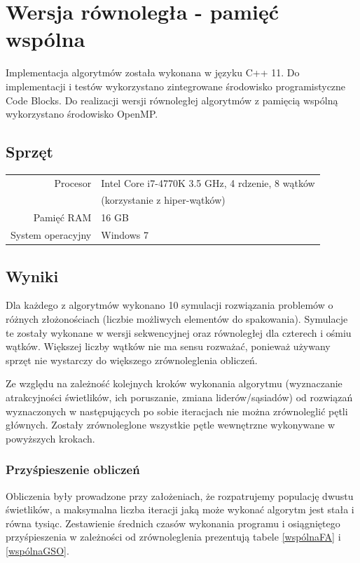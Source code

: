 \documentclass[11pt,a4paper,twoside]{article}
\begin{document}
\section{Wersja równoległa - pamięć wspólna}
Implementacja algorytmów została wykonana w języku C++ 11. Do implementacji i testów wykorzystano zintegrowane środowisko programistyczne Code Blocks. Do realizacji wersji równoległej algorytmów z pamięcią wspólną wykorzystano środowisko OpenMP.

\subsection{Sprzęt}
\bgroup
\def\arraystretch{1.3}
\begin{tabular}{rl}
\centering
 Procesor & Intel Core i7-4770K 3.5 GHz, 4 rdzenie, 8 wątków  \\
 & (korzystanie z hiper-wątków)\\
 Pamięć RAM &  16 GB\\
 System operacyjny & Windows 7 \\ 

\end{tabular}
\egroup

\subsection{Wyniki}
Dla każdego z algorytmów wykonano 10 symulacji rozwiązania problemów o różnych złożonościach (liczbie możliwych elementów do spakowania). Symulacje te zostały wykonane w wersji sekwencyjnej oraz równoległej dla czterech i ośmiu wątków. Większej liczby wątków nie ma sensu rozważać, ponieważ używany sprzęt nie wystarczy do większego zrównoleglenia obliczeń.

Ze względu na zależność kolejnych kroków wykonania algorytmu (wyznaczanie atrakcyjności świetlików, ich poruszanie, zmiana liderów/sąsiadów) od rozwiązań wyznaczonych w następujących po sobie iteracjach nie można zrównoleglić pętli głównych. Zostały zrównoleglone wszystkie pętle wewnętrzne wykonywane w powyższych krokach.


\subsubsection{Przyśpieszenie obliczeń}
Obliczenia były prowadzone przy założeniach, że rozpatrujemy populację dwustu świetlików, a maksymalna liczba iteracji jaką może wykonać algorytm jest stała i równa tysiąc. Zestawienie średnich czasów wykonania programu i osiągniętego przyśpieszenia w zależności od zrównoleglenia prezentują tabele \ref{wspólnaFA} i \ref{wspólnaGSO}.
\end{document}
